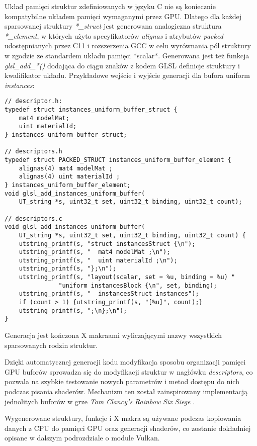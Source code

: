 Układ pamięci struktur zdefiniowanych w języku C nie są koniecznie kompatybilne układem pamięci wymaganymi przez GPU.
Dlatego dla każdej sparsowanej struktury \textit{*\_struct} jest generowana analogiczna struktura \textit{*\_element}, w których użyto specyfikatorów \textit{alignas} i atrybutów \textit{packed} udostępnianych przez C11 i rozszerzenia GCC w celu wyrównania pól struktury w zgodzie ze standardem układu pamięci *scalar*.
Generowana jest też funkcja \textit{glsl\_add\_*()} dodająca do ciągu znaków z kodem GLSL definicje struktury i kwalifikator układu.
Przykładowe wejście i wyjście generacji dla bufora uniform \textit{instances}:
\lstset{language=C}
\begin{lstlisting}
// descriptor.h:
typedef struct instances_uniform_buffer_struct {
	mat4 modelMat;
	uint materialId;
} instances_uniform_buffer_struct;
	
// descriptors.h
typedef struct PACKED_STRUCT instances_uniform_buffer_element {
	alignas(4) mat4 modelMat ;
	alignas(4) uint materialId ;
} instances_uniform_buffer_element;
void glsl_add_instances_uniform_buffer(
	UT_string *s, uint32_t set, uint32_t binding, uint32_t count);

// descriptors.c
void glsl_add_instances_uniform_buffer(
	UT_string *s, uint32_t set, uint32_t binding, uint32_t count) {
	utstring_printf(s, "struct instancesStruct {\n");
	utstring_printf(s, "  mat4 modelMat ;\n");
	utstring_printf(s, "  uint materialId ;\n");
	utstring_printf(s, "};\n");
	utstring_printf(s, "layout(scalar, set = %u, binding = %u) "
			   "uniform instancesBlock {\n", set, binding);
	utstring_printf(s, "  instancesStruct instances");
	if (count > 1) {utstring_printf(s, "[%u]", count);}
	utstring_printf(s, ";\n};\n");
}
\end{lstlisting}
Generacja jest kończona X makraami wyliczającymi nazwy wszystkich sparsowanych rodzin struktur. 

Dzięki automatycznej generacji kodu modyfikacja sposobu organizacji pamięci GPU buforów sprowadza się do modyfikacji struktur w nagłówku \textit{descriptors}, co pozwala na szybkie testowanie nowych parametrów i metod dostępu do nich podczas pisania shaderów.
Mechanizm ten został zainspirowany implementacją jednolitych buforów w grze \textit{Tom Clancy's Rainbow Six Siege} \cite{RAINBOWSIXSIEGE}.

Wygenerowane struktury, funkcje i X makra są używane podczas kopiowania danych z CPU do pamięci GPU oraz generacji shaderów, co zostanie dokładniej opisane w dalszym podrozdziale o module Vulkan.

